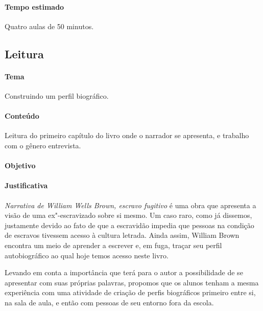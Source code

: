 \documentclass[11pt]{extarticle}
\begin{document}
\paragraph{Tempo estimado} Quatro aulas de 50 minutos.


\subsection{Leitura}


 \paragraph{Tema} Construindo um perfil biográfico. 

 \paragraph{Conteúdo} Leitura do primeiro capítulo do livro onde o
 narrador se apresenta, e trabalho com o gênero entrevista. 

 \paragraph{Objetivo} 

 \paragraph{Justificativa} \emph{Narrativa de William Wells Brown, escravo fugitivo}
 é uma obra que apresenta a visão de uma ex"-escravizado sobre si mesmo. 
 Um caso raro, como já dissemos, justamente devido ao fato de que a 
 escravidão impedia que pessoas na condição de escravos tivessem acesso
 à cultura letrada. Ainda assim, William Brown encontra um meio de aprender
 a escrever e, em fuga, traçar seu perfil autobiográfico ao qual hoje temos acesso
 neste livro.

 Levando em conta a importância que terá para o autor a possibilidade
 de se apresentar com suas próprias palavras, propomos que os alunos
 tenham a mesma experiência com uma atividade de criação de perfis 
 biográficos primeiro entre si, na sala de aula, e então com pessoas
 de seu entorno fora da escola.
\end{document}
